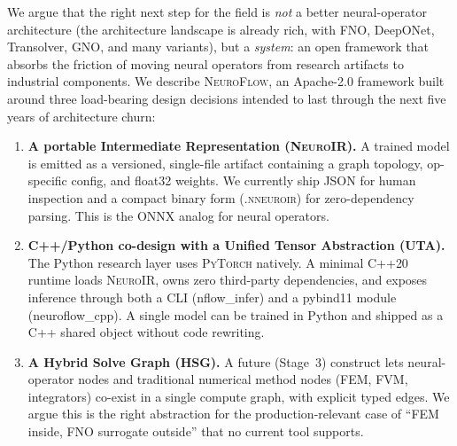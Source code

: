 \documentclass[10pt,twocolumn]{article}
\renewcommand{\texttt}[1]{{\normalfont\ttfamily #1}\normalfont\rmfamily}
\newcommand{\nf}{\textsc{NeuroFlow}}
\newcommand{\neuroir}{\textsc{NeuroIR}}
\newcommand{\nneuroir}{\textsc{.nneuroir}}
\newcommand{\py}{\textsc{PyTorch}}
\begin{document}
We argue that the right next step for the field is \emph{not} a
better neural-operator architecture (the architecture landscape is
already rich, with FNO, DeepONet, Transolver, GNO, and many
variants), but a \emph{system}: an open framework that absorbs the
friction of moving neural operators from research artifacts to
industrial components.
%
We describe \nf{}, an Apache-2.0 framework built around three
load-bearing design decisions intended to last through the next
five years of architecture churn:

\begin{enumerate}[leftmargin=*,itemsep=2pt,topsep=2pt]
  \item \textbf{A portable Intermediate Representation (\neuroir{}).}
  A trained model is emitted as a versioned, single-file artifact
  containing a graph topology, op-specific config, and float32
  weights.  We currently ship JSON for human inspection and a compact
  binary form (\nneuroir{}) for zero-dependency parsing.  This is
  the ONNX analog for neural operators.
  \item \textbf{C{++}/Python co-design with a Unified Tensor
  Abstraction (UTA).}  The Python research layer uses \py{} natively.
  A minimal C{++}20 runtime loads \neuroir{}, owns zero third-party
  dependencies, and exposes inference through both a CLI
  (\texttt{nflow\_infer}) and a pybind11 module
  (\texttt{neuroflow\_cpp}).  A single model can be trained in
  Python and shipped as a C{++} shared object without code
  rewriting.
  \item \textbf{A Hybrid Solve Graph (HSG).}  A future (Stage~3)
  construct lets neural-operator nodes and traditional numerical
  method nodes (FEM, FVM, integrators) co-exist in a single compute
  graph, with explicit typed edges.  We argue this is the right
  abstraction for the production-relevant case of ``FEM inside, FNO
  surrogate outside'' that no current tool supports.
\end{enumerate}
\end{document}
